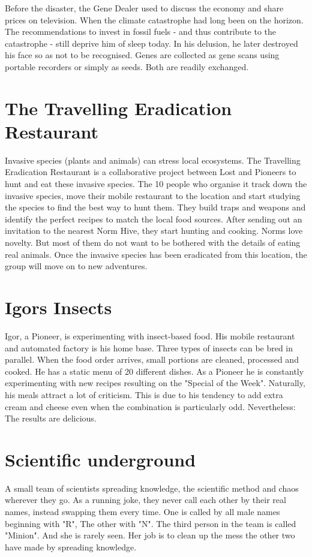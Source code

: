 Before the disaster, the Gene Dealer used to discuss the economy and share prices on television. When the climate catastrophe had long been on the horizon. The recommendations to invest in fossil fuels - and thus contribute to the catastrophe - still deprive him of sleep today. In his delusion, he later destroyed his face so as not to be recognised.
Genes are collected as gene scans using portable recorders or simply as seeds. Both are readily exchanged.

\section{The Travelling Eradication Restaurant}
\label{sec:Eradication Restaurant}

Invasive species (plants and animals) can stress local ecosystems. The Travelling Eradication Restaurant is a collaborative project between Lost and Pioneers to hunt and eat these invasive species.
The 10 people who organise it track down the invasive species, move their mobile restaurant to the location and start studying the species to find the best way to hunt them. They build traps and weapons and identify the perfect recipes to match the local food sources.
After sending out an invitation to the nearest Norm Hive, they start hunting and cooking.
Norms love novelty. But most of them do not want to be bothered with the details of eating real animals.
Once the invasive species has been eradicated from this location, the group will move on to new adventures.

\section{Igors Insects}
\label{sec:Igors Insects}

Igor, a Pioneer, is experimenting with insect-based food. His mobile restaurant and automated factory is his home base. Three types of insects can be bred in parallel. When the food order arrives, small portions are cleaned, processed and cooked.
He has a static menu of 20 different dishes. As a Pioneer he is constantly experimenting with new recipes resulting on the "Special of the Week".
Naturally, his meals attract a lot of criticism. This is due to his tendency to add extra cream and cheese even when the combination is particularly odd. Nevertheless: The results are delicious.

\section{Scientific underground}
\label{sec:Scientific Underground}
A small team of scientists spreading knowledge, the scientific method and chaos wherever they go. As a running joke, they never call each other by their real names, instead swapping them every time. One is called by all male names beginning with "R",
The other with "N". The third person in the team is called "Minion". And she is rarely seen. Her job is to clean up the mess the other two have made by spreading knowledge.

